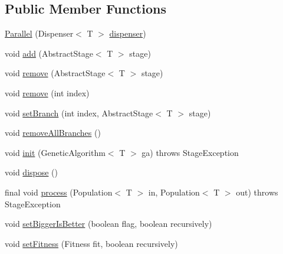 \subsection*{Public Member Functions}
\begin{DoxyCompactItemize}
\item 
\hyperlink{classjenes_1_1stage_1_1_parallel_3_01_t_01extends_01_chromosome_01_4_a933c7a845f624f290f27c9921e6e8ca9}{Parallel} (Dispenser$<$ T $>$ \hyperlink{classjenes_1_1stage_1_1_parallel_3_01_t_01extends_01_chromosome_01_4_a65e70bc6dd645a250f0f0d41c36061c9}{dispenser})
\item 
void \hyperlink{classjenes_1_1stage_1_1_parallel_3_01_t_01extends_01_chromosome_01_4_afe3cf6bd36f7e0f7246cbf609d9cbdf2}{add} (Abstract\-Stage$<$ T $>$ stage)
\item 
void \hyperlink{classjenes_1_1stage_1_1_parallel_3_01_t_01extends_01_chromosome_01_4_adb15ae336a8829eb0a8f984eb7aac3ca}{remove} (Abstract\-Stage$<$ T $>$ stage)
\item 
void \hyperlink{classjenes_1_1stage_1_1_parallel_3_01_t_01extends_01_chromosome_01_4_acf777ee17edc34cb81d2d0fc145cffc4}{remove} (int index)
\item 
void \hyperlink{classjenes_1_1stage_1_1_parallel_3_01_t_01extends_01_chromosome_01_4_a115d20da27789c0a053ed7e161838477}{set\-Branch} (int index, Abstract\-Stage$<$ T $>$ stage)
\item 
void \hyperlink{classjenes_1_1stage_1_1_parallel_3_01_t_01extends_01_chromosome_01_4_acc2efb924520eb73061928e39580202c}{remove\-All\-Branches} ()
\item 
void \hyperlink{classjenes_1_1stage_1_1_parallel_3_01_t_01extends_01_chromosome_01_4_a75d99b7406d735b297e6192b2ac130e9}{init} (Genetic\-Algorithm$<$ T $>$ ga)  throws Stage\-Exception 
\item 
void \hyperlink{classjenes_1_1stage_1_1_parallel_3_01_t_01extends_01_chromosome_01_4_a67831e08edd3b98bf0d81778cf067aeb}{dispose} ()
\item 
final void \hyperlink{classjenes_1_1stage_1_1_parallel_3_01_t_01extends_01_chromosome_01_4_a504ed9a0dddbfd46a9bebd4a38dba964}{process} (Population$<$ T $>$ in, Population$<$ T $>$ out)  throws Stage\-Exception 
\item 
void \hyperlink{classjenes_1_1stage_1_1_parallel_3_01_t_01extends_01_chromosome_01_4_ae8ea18096e341f41bf44c56ba1628a99}{set\-Bigger\-Is\-Better} (boolean flag, boolean recursively)
\item 
void \hyperlink{classjenes_1_1stage_1_1_parallel_3_01_t_01extends_01_chromosome_01_4_ae50a3b3fae5a0b2c3465a0bae243263b}{set\-Fitness} (Fitness fit, boolean recursively)
\end{DoxyCompactItemize}
